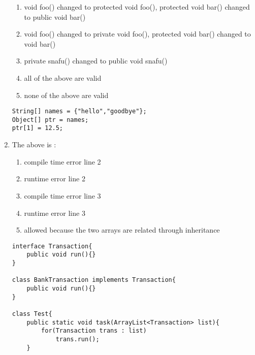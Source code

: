 \documentclass{article}
\begin{document}
\begin{enumerate}
	\begin{enumerate}
		\item void foo(){} changed to protected void foo(){}, protected void bar(){} changed to public void bar(){}
		\item void foo(){} changed to private void foo(){}, protected void bar(){} changed to void bar(){}
		\item private snafu(){} changed to public void snafu(){}
		\item all of the above are valid
		\item none of the above are valid
	\end{enumerate}
	\begin{lstlisting} 
String[] names = {"hello","goodbye"};
Object[] ptr = names;
ptr[1] = 12.5;
	\end{lstlisting}
	\item The above is :
	\begin{enumerate}
		\item compile time error line 2
		\item runtime error line 2
		\item compile time error line 3
		\item runtime error line 3
		\item allowed because the two arrays are related through inheritance
	\end{enumerate}
	\begin{lstlisting} 
interface Transaction{
	public void run(){}
}

class BankTransaction implements Transaction{
	public void run(){}
}

class Test{
	public static void task(ArrayList<Transaction> list){
		for(Transaction trans : list)
			trans.run();
	}
	

\end{lstlisting}
\end{enumerate}
\end{document}
